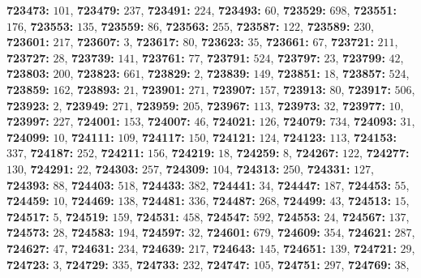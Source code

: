 \textsf{\bfseries 723473:} $101$, \textsf{\bfseries 723479:} $237$, \textsf{\bfseries 723491:} $224$, \textsf{\bfseries 723493:} $60$, \textsf{\bfseries 723529:} $698$, \textsf{\bfseries 723551:} $176$, \textsf{\bfseries 723553:} $135$, \textsf{\bfseries 723559:} $86$, \textsf{\bfseries 723563:} $255$, \textsf{\bfseries 723587:} $122$, \textsf{\bfseries 723589:} $230$, \textsf{\bfseries 723601:} $217$, \textsf{\bfseries 723607:} $3$, \textsf{\bfseries 723617:} $80$, \textsf{\bfseries 723623:} $35$, \textsf{\bfseries 723661:} $67$, \textsf{\bfseries 723721:} $211$, \textsf{\bfseries 723727:} $28$, \textsf{\bfseries 723739:} $141$, \textsf{\bfseries 723761:} $77$, \textsf{\bfseries 723791:} $524$, \textsf{\bfseries 723797:} $23$, \textsf{\bfseries 723799:} $42$, \textsf{\bfseries 723803:} $200$, \textsf{\bfseries 723823:} $661$, \textsf{\bfseries 723829:} $2$, \textsf{\bfseries 723839:} $149$, \textsf{\bfseries 723851:} $18$, \textsf{\bfseries 723857:} $524$, \textsf{\bfseries 723859:} $162$, \textsf{\bfseries 723893:} $21$, \textsf{\bfseries 723901:} $271$, \textsf{\bfseries 723907:} $157$, \textsf{\bfseries 723913:} $80$, \textsf{\bfseries 723917:} $506$, \textsf{\bfseries 723923:} $2$, \textsf{\bfseries 723949:} $271$, \textsf{\bfseries 723959:} $205$, \textsf{\bfseries 723967:} $113$, \textsf{\bfseries 723973:} $32$, \textsf{\bfseries 723977:} $10$, \textsf{\bfseries 723997:} $227$, \textsf{\bfseries 724001:} $153$, \textsf{\bfseries 724007:} $46$, \textsf{\bfseries 724021:} $126$, \textsf{\bfseries 724079:} $734$, \textsf{\bfseries 724093:} $31$, \textsf{\bfseries 724099:} $10$, \textsf{\bfseries 724111:} $109$, \textsf{\bfseries 724117:} $150$, \textsf{\bfseries 724121:} $124$, \textsf{\bfseries 724123:} $113$, \textsf{\bfseries 724153:} $337$, \textsf{\bfseries 724187:} $252$, \textsf{\bfseries 724211:} $156$, \textsf{\bfseries 724219:} $18$, \textsf{\bfseries 724259:} $8$, \textsf{\bfseries 724267:} $122$, \textsf{\bfseries 724277:} $130$, \textsf{\bfseries 724291:} $22$, \textsf{\bfseries 724303:} $257$, \textsf{\bfseries 724309:} $104$, \textsf{\bfseries 724313:} $250$, \textsf{\bfseries 724331:} $127$, \textsf{\bfseries 724393:} $88$, \textsf{\bfseries 724403:} $518$, \textsf{\bfseries 724433:} $382$, \textsf{\bfseries 724441:} $34$, \textsf{\bfseries 724447:} $187$, \textsf{\bfseries 724453:} $55$, \textsf{\bfseries 724459:} $10$, \textsf{\bfseries 724469:} $138$, \textsf{\bfseries 724481:} $336$, \textsf{\bfseries 724487:} $268$, \textsf{\bfseries 724499:} $43$, \textsf{\bfseries 724513:} $15$, \textsf{\bfseries 724517:} $5$, \textsf{\bfseries 724519:} $159$, \textsf{\bfseries 724531:} $458$, \textsf{\bfseries 724547:} $592$, \textsf{\bfseries 724553:} $24$, \textsf{\bfseries 724567:} $137$, \textsf{\bfseries 724573:} $28$, \textsf{\bfseries 724583:} $194$, \textsf{\bfseries 724597:} $32$, \textsf{\bfseries 724601:} $679$, \textsf{\bfseries 724609:} $354$, \textsf{\bfseries 724621:} $287$, \textsf{\bfseries 724627:} $47$, \textsf{\bfseries 724631:} $234$, \textsf{\bfseries 724639:} $217$, \textsf{\bfseries 724643:} $145$, \textsf{\bfseries 724651:} $139$, \textsf{\bfseries 724721:} $29$, \textsf{\bfseries 724723:} $3$, \textsf{\bfseries 724729:} $335$, \textsf{\bfseries 724733:} $232$, \textsf{\bfseries 724747:} $105$, \textsf{\bfseries 724751:} $297$, \textsf{\bfseries 724769:} $38$, 
